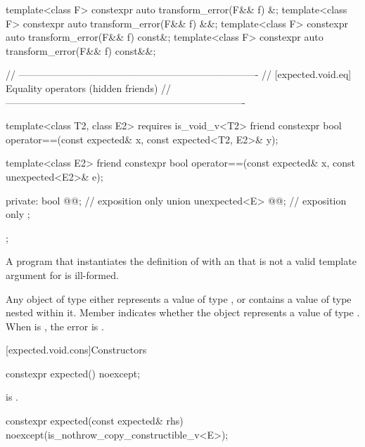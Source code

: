 \begin{codeblock}
{{    template<class F> constexpr auto transform_error(F&& f) &;
    template<class F> constexpr auto transform_error(F&& f) &&;
    template<class F> constexpr auto transform_error(F&& f) const&;
    template<class F> constexpr auto transform_error(F&& f) const&&;

    // -------------------------------------------------------------------------
    // [expected.void.eq] Equality operators (hidden friends)
    // -------------------------------------------------------------------------

    template<class T2, class E2>
      requires is_void_v<T2>
    friend constexpr bool operator==(const expected& x, const expected<T2, E2>& y);

    template<class E2>
    friend constexpr bool operator==(const expected& x, const unexpected<E2>& e);

  private:
    bool @@; // exposition only
    union {
      unexpected<E> @@; // exposition only
    };
  };
}
\end{codeblock}

\begin{itemdescr}
\pnum
\mandates
A program that instantiates the definition of  with an  that is not a valid template argument for  is ill-formed.

\pnum
\remarks
Any object of type  either represents a value of type , or contains a value of type  nested within it. Member  indicates whether the  object represents a value of type . When  is , the error is .
\end{itemdescr}

[expected.void.cons]{Constructors}

%
\begin{itemdecl}
constexpr expected() noexcept;
\end{itemdecl}

\begin{itemdescr}
\pnum
\ensures
{} is .
\end{itemdescr}

%
\begin{itemdecl}
constexpr expected(const expected& rhs) noexcept(is_nothrow_copy_constructible_v<E>);
\end{itemdecl}

